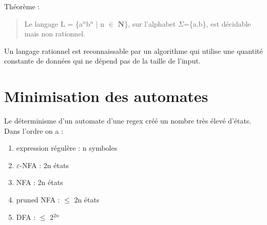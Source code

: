 \documentclass{article}
\begin{document}
Théorème :
\begin{quote}
    Le langage L = \{a$^{n}$b$^{n}$ | n $\in$ $\mathbf{N}$\}, sur l'alphabet $\Sigma$=\{a,b\}, est décidable mais non rationnel.
\end{quote}

Un langage rationnel est reconnaissable par un algorithme qui utilise une quantité constante de données qui  ne dépend pas de la taille de l'input.

\section{Minimisation des automates}
Le déterminisme d'un automate d'une regex créé un nombre très élevé d'états. Dans l'ordre on a :
\begin{enumerate}
    \item expression régulère : n symboles
    \item $\varepsilon$-NFA : 2n états
    \item NFA : 2n états
    \item pruned NFA : $\leqslant$ 2n états
    \item DFA : $\leqslant$ 2$^{2n}$
\end{enumerate}
\end{document}
